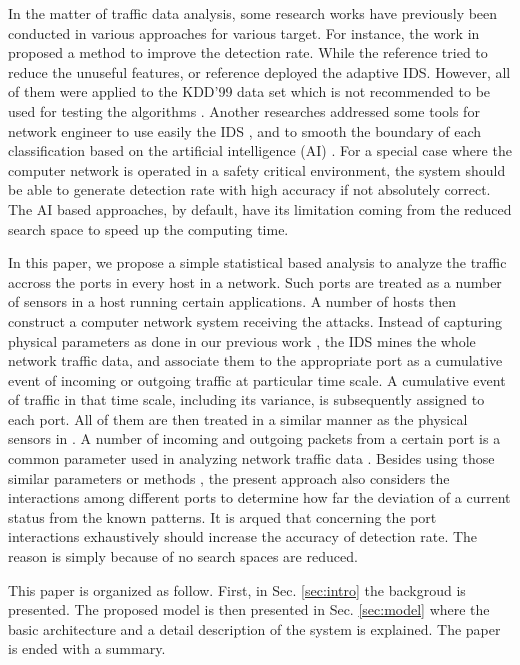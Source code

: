 \documentclass[conference,10pt,a4paper]{IEEEtran}
\begin{document}
In the matter of traffic data analysis, some research works have previously been conducted in various approaches for various target. For instance, the work in \cite{AdaBoost,kMeans} proposed a method to improve the detection rate. While the reference \cite{ashokSVM,MultipleKernel} tried to reduce the unuseful features, or reference \cite{OutlierKe} deployed the adaptive IDS. However, all of them were applied to the KDD'99 data set which is not recommended to be used for testing the algorithms \cite{KDnuggets,Mahbod}. Another researches addressed some tools for network engineer to use easily the IDS \cite{Association}, and to smooth the boundary of each classification based on the artificial intelligence (AI) \cite{fuzzyAssociation}. For a special case where the computer network is operated in a safety critical environment, the system should be able to generate detection rate with high accuracy if not absolutely correct. The AI based approaches, by default, have its limitation coming from the reduced search space to speed up the computing time.

In this paper, we propose a simple statistical based analysis to analyze the traffic accross the ports in every host in a network. Such ports are treated as a number of sensors in a host running certain applications. A number of hosts then construct a computer network system receiving the attacks. Instead of capturing physical parameters as done in our previous work \cite{arya}, the IDS mines the whole network traffic data, and associate them to the appropriate port as a cumulative event of incoming or outgoing traffic at particular time scale. A cumulative event of traffic in that time scale, including its variance, is subsequently assigned to each port. All of them are then treated in a similar manner as the physical sensors in \cite{arya}. A number of incoming and outgoing packets from a certain port is a common parameter used in analyzing network traffic data \cite{gabra2012data}. Besides using those similar parameters \cite{VerwoerdIDSApproach} or methods \cite{vaarandi,dzhao}, the present approach  also considers the interactions among different ports to determine how far the deviation of a current status from the known patterns. It is arqued that concerning the port interactions exhaustively should increase the accuracy of detection rate. The reason is simply because of no search spaces are reduced.

This paper is organized as follow. First, in Sec. \ref{sec:intro} the backgroud is presented. The proposed model is then presented in Sec. \ref{sec:model} where the basic architecture and a detail description of the system is explained. The paper is ended with a summary.
\end{document}
